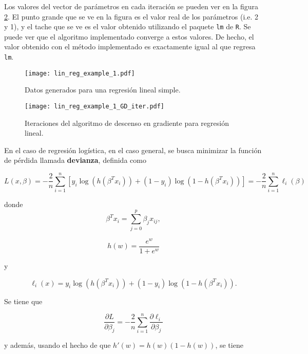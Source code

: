 Los valores del vector de parámetros en cada iteración se pueden ver en la figura \ref{fig:reg_lineal_ejemplo_GD_iter}. El punto grande que se ve en la figura es el valor real de los parámetros (i.e. 2 y 1), y el tache que se ve es el valor obtenido utilizando el paquete \texttt{lm} de \texttt{R}. Se puede ver que el algoritmo implementado converge a estos valores. De hecho, el valor obtenido con el método implementado es exactamente igual al que regresa \texttt{lm}.


\begin{figure}[H]
  \centering
  \texttt{[image: lin\_reg\_example\_1.pdf]}
  \caption{Datos generados para una regresión lineal simple.}
  \label{fig:reg_lineal_ejemplo}
\end{figure}

\begin{figure}[H]
  \centering
  \texttt{[image: lin\_reg\_example\_1\_GD\_iter.pdf]}
  \caption{Iteraciones del algoritmo de descenso en gradiente para regresión lineal.}
  \label{fig:reg_lineal_ejemplo_GD_iter}
\end{figure}


En el caso de regresión logística, en el caso general, se busca minimizar la función de pérdida llamada \textbf{devianza}, definida como

\begin{equation}
  \label{eq:devianza_reg_log}
  L(x, \beta) = - \frac{2}{n} \sum_{i=1}^{n} \left[ y_i \log(h(\beta^T x_i)) + (1-y_i) \log(1-h(\beta^T x_i)) \right] = 
     - \frac{2}{n} \sum_{i=1}^{n}{\ell_i(\beta)}
\end{equation}

donde 
$$
  \beta^T x_i = \sum_{j=0}^{p}{\beta_j x_{ij}},
$$ 

$$
  h(w) = \frac{e^w}{1+e^w}
$$ 

y 

$$
\ell_i(x) = y_i \log(h(\beta^T x_i)) + (1-y_i) \log(1-h(\beta^T x_i)).
$$

Se tiene que 

$$
  \frac{\partial L}{\partial \beta_j} = -\frac{2}{n} \sum_{i = 1}^n { \frac{\partial \ell_i}{\partial \beta_j} }
$$

y además, usando el hecho de que $h'(w) = h(w)(1-h(w))$, se tiene

